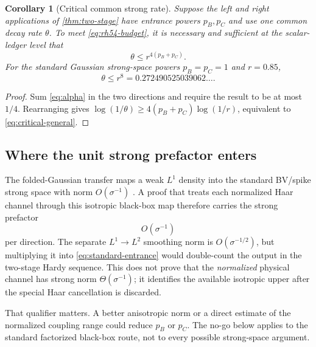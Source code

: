 \documentclass[11pt]{article}
\newtheorem{corollary}[theorem]{Corollary}
\theoremstyle{remark}
\begin{document}
\begin{corollary}[Critical common strong rate]
\label{cor:critical-rate}
Suppose the left and right applications of \cref{thm:two-stage} have entrance
powers $p_B,p_C$ and use one common decay rate $\theta$.  To meet
\eqref{eq:rh54-budget}, it is necessary and sufficient at the scalar-ledger
level that
\begin{equation}
 \theta
 \le r^{4(p_B+p_C)}.
 \label{eq:critical-general}
\end{equation}
For the standard Gaussian strong-space powers
$p_B=p_C=1$ and $r=0.85$,
\begin{equation}
 \boxed{
 \theta\le r^8
 =0.272490525039062\ldots.}
 \label{eq:r8}
\end{equation}
\end{corollary}

\begin{proof}
Sum \eqref{eq:alpha} in the two directions and require the result to be at
most $1/4$.  Rearranging gives
$\log(1/\theta)\ge4(p_B+p_C)\log(1/r)$, equivalent to
\eqref{eq:critical-general}.
\end{proof}

\subsection{Where the unit strong prefactor enters}

The folded-Gaussian transfer maps a weak $L^1$ density into the standard
BV/spike strong space with norm $O(\sigma^{-1})$
\citep{WangRieszCutoff2026}.  A proof that treats each normalized Haar
channel through this isotropic black-box map therefore carries the strong
prefactor
\begin{equation}
 O(\sigma^{-1})
 \label{eq:standard-entrance}
\end{equation}
per direction.  The separate $L^1\to L^2$ smoothing norm is
$O(\sigma^{-1/2})$, but multiplying it into \eqref{eq:standard-entrance}
would double-count the output in the two-stage Hardy sequence.  This does
not prove that the \emph{normalized} physical channel has strong norm
$\Theta(\sigma^{-1})$; it identifies the available isotropic upper after the
special Haar cancellation is discarded.

That qualifier matters.  A better anisotropic norm or a direct estimate of
the normalized coupling range could reduce $p_B$ or $p_C$.  The no-go below
applies to the standard factorized black-box route, not to every possible
strong-space argument.
\end{document}
